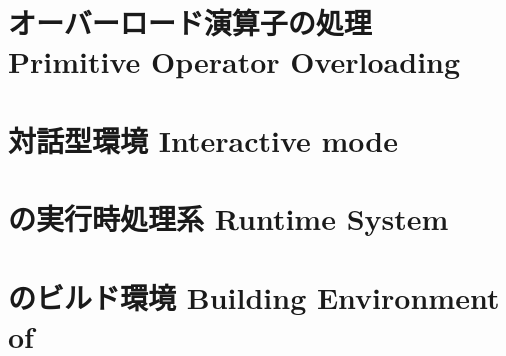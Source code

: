 \chapter{\txt
{オーバーロード演算子の処理}
{Primitive Operator Overloading}
}
\label{chap:primitiveoverloading}

\chapter{\txt
{対話型環境}
{Interactive mode}
}
\label{chap:interactivemode}

\chapter{\txt
{\smlsharp{}の実行時処理系}
{\smlsharp{} Runtime System }
}
\label{chap:runtimesystem}

\chapter{\txt
{\smlsharp{}のビルド環境}
{Building Environment of \smlsharp{}}
}
\label{chap:buildsystem}


